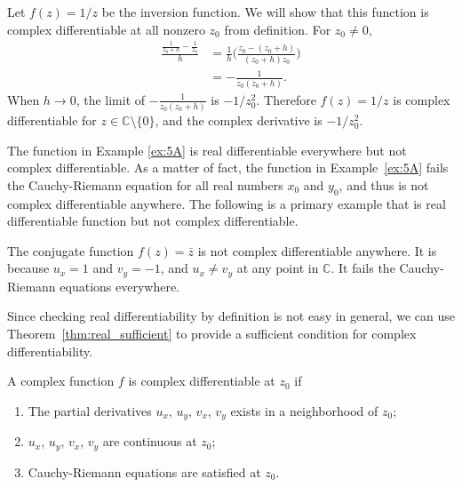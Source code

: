 \begin{example}
	Let $f(z) = 1/z$ be the inversion function. We will show that this function is complex differentiable at all nonzero $z_0$ from definition. For $z_0\neq 0$,
	\begin{align*}
		\frac{\frac{1}{z_0+h} - \frac{1}{z_0}}{h} &=
		\frac{1}{h}\Big( \frac{z_0-(z_0+h)}{(z_0+h)z_0}\Big) \\
		&= - \frac{1}{z_0(z_0+h)}.
	\end{align*}
	When $h\rightarrow 0$, the limit  of $- \frac{1}{z_0(z_0+h)}$ is $-1/z_0^2$. Therefore $f(z)=1/z$ is complex differentiable for $z\in\mathbb{C}\setminus\{0\}$, and the complex derivative is $-1/z_0^2$.
	\label{ex:holomorphic_example4}
\end{example}


The function in Example \ref{ex:5A} is real differentiable everywhere but not complex differentiable. As a matter of fact, the function in Example~\ref{ex:5A} fails the Cauchy-Riemann equation for all real numbers $x_0$ and $y_0$, and thus is not complex differentiable anywhere. The following is a primary example that is real differentiable function but not complex differentiable.

\begin{example}
	The conjugate function $f(z) = \bar{z}$ is not complex differentiable anywhere. It is because $u_x=1$ and $v_y=-1$, and $u_x\neq v_y$ at any point in $\mathbb{C}$. It fails the Cauchy-Riemann equations everywhere.
	\label{ex:holomorphic_example2}
\end{example}

Since checking real differentiability by definition is not easy in general, we can use Theorem~\ref{thm:real_sufficient} to provide a sufficient condition for complex differentiability. 

\renewcommand{\labelenumi}{(\roman{enumi}).}
\begin{svgraybox}
	\begin{theorem}
		A complex function $f$ is complex differentiable at $z_0$ if
		\begin{enumerate}
			\item The partial derivatives $u_x$, $u_y$, $v_x$, $v_y$ exists in a neighborhood of $z_0$;
			\item $u_x$, $u_y$, $v_x$, $v_y$  are continuous at $z_0$;
			\item Cauchy-Riemann equations are satisfied at $z_0$.
		\end{enumerate}
		\label{thm:complex_differentiable}
	\end{theorem}
\end{svgraybox}



